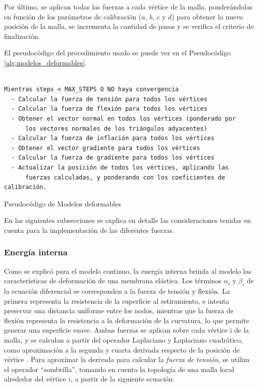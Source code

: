 Por último, se aplican todas las fuerzas a cada vértice de la malla, ponderándolas en función de los parámetros de calibración ($a$, $b$, $c$ y $d$) para obtener la nueva posición de la malla, se incrementa la cantidad de pasos y se verifica el criterio de finalización.

El pseudocódigo del procedimiento usado se puede ver en el Pseudocódigo \ref{alg:modelos_deformables}.

\begin{program}
\begin{verbatim}

Mientras steps < MAX_STEPS O NO haya convergencia
  - Calcular la fuerza de tensión para todos los vértices
  - Calcular la fuerza de flexión para todos los vértices
  - Obtener el vector normal en todos los vértices (ponderado por 
      los vectores normales de los triángulos adyacentes)
  - Calcular la fuerza de inflación para todos los vértices
  - Obtener el vector gradiente para todos los vértices
  - Calcular la fuerza de gradiente para todos los vértices
  - Actualizar la posición de todos los vértices, aplicando las 
      fuerzas calculadas, y ponderando con los coeficientes de calibración.
\end{verbatim}
\caption{Pseudocódigo de Modelos deformables}
\label{alg:modelos_deformables}
\end{program}

En las siguientes subsecciones se explica en detalle las consideraciones tenidas en cuenta para la implementación de las diferentes fuerzas.

\subsubsection{Energía interna}\label{section:energia_interna}
Como se explicó para el modelo continuo, la energía interna brinda al modelo las características de deformación de una membrana elástica. Los términos $\alpha_{i}$ y $\beta_{i}$ de la ecuación diferencial se corresponden a la fuerza de tensión y flexión. La primera representa la resistencia de la superficie al estiramiento, e intenta preservar una distancia uniforme entre los nodos, mientras que la fuerza de flexión representa la resistencia a la deformación de la curvatura, lo que permite generar una superficie suave. Ambas fuerzas se aplican sobre cada vértice i de la malla, y se calculan a partir del operador Laplaciano y Laplaciano cuadrático, como aproximación a la segunda y cuarta derivada respecto de la posición de vértice \citep{mcinerney2000t}. Para aproximar la derivada para calcular la \emph{fuerza de tensión}, se utiliza el operador “sombrilla”, tomando en cuenta la topología de una malla local alrededor del vértice $i$, a partir de la siguiente ecuación:

